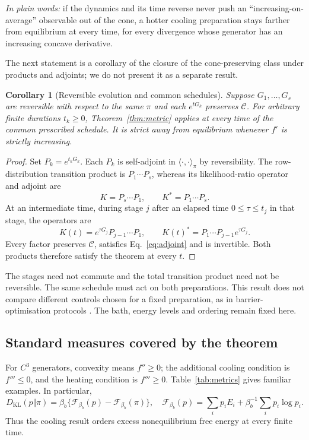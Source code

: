 \documentclass[11pt,a4paper]{article}
\newtheorem{corollary}[theorem]{Corollary}
\theoremstyle{remark}\newtheorem{remark}[theorem]{Remark}
\newcommand{\C}{\mathcal C}
\newcommand{\KL}{D_{\mathrm{KL}}}
\newcommand{\takeaway}[1]{\par\smallskip\noindent\textit{In plain words:} #1\par\smallskip}
\begin{document}
\takeaway{if the dynamics and its time reverse never push an ``increasing-on-average'' observable out of the cone, a hotter cooling preparation stays farther from equilibrium at every time, for every divergence whose generator has an increasing concave derivative.}

The next statement is a corollary of the closure of the cone-preserving class under products and adjoints; we do not present it as a separate result.
\begin{corollary}[Reversible evolution and common schedules]\label{cor:protocol}
Suppose $G_1,\ldots,G_s$ are reversible with respect to the same $\pi$ and each $e^{tG_k}$ preserves $\C$. For arbitrary finite durations $t_k\ge0$, Theorem~\ref{thm:metric} applies at every time of the common prescribed schedule. It is strict away from equilibrium whenever $f'$ is strictly increasing.
\end{corollary}
\begin{proof}
Set $P_k=e^{t_kG_k}$. Each $P_k$ is self-adjoint in $\langle\cdot,\cdot\rangle_\pi$ by reversibility. The row-distribution transition product is $P_1\cdots P_s$, whereas its likelihood-ratio operator and adjoint are
\begin{equation}
 K=P_s\cdots P_1,\qquad K^*=P_1\cdots P_s.
 \label{eq:protocol}
\end{equation}
At an intermediate time, during stage $j$ after an elapsed time $0\le\tau\le t_j$ in that stage, the operators are
\begin{equation}
 K(t)=e^{\tau G_j}P_{j-1}\cdots P_1,\qquad K(t)^*=P_1\cdots P_{j-1}e^{\tau G_j}.
\end{equation}
Every factor preserves $\C$, satisfies Eq.~\eqref{eq:adjoint} and is invertible. Both products therefore satisfy the theorem at every $t$.
\end{proof}

The stages need not commute and the total transition product need not be reversible. The same schedule must act on both preparations. This result does not compare different controls chosen for a fixed preparation, as in barrier-optimisation protocols \cite{Wang2026}. The bath, energy levels and ordering remain fixed here.

\subsection{Standard measures covered by the theorem}
For $C^3$ generators, convexity means $f''\ge0$; the additional cooling condition is $f'''\le0$, and the heating condition is $f'''\ge0$. Table~\ref{tab:metrics} gives familiar examples. In particular,
\begin{equation}
 \KL(p\Vert\pi)=\beta_b\{\mathcal F_{\beta_b}(p)-\mathcal F_{\beta_b}(\pi)\},
 \quad \mathcal F_{\beta_b}(p)=\sum_i p_iE_i+\beta_b^{-1}\sum_i p_i\log p_i.
\end{equation}
Thus the cooling result orders excess nonequilibrium free energy at every finite time.
\end{document}
